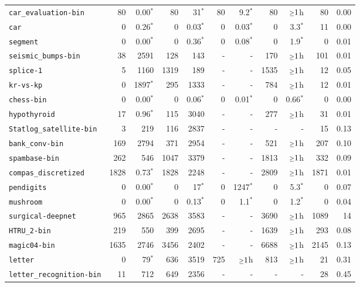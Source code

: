 \begin{tabular}{lrrrrrrrrrr}
\texttt{car\_evaluation-bin} & 80 & 0.00$^*$ & 80 & 31$^*$ & 80 & 9.2$^*$ & 80 & $\mathsmaller{\geq}1$h & 80 & 0.00\\
\texttt{car} & 0 & 0.26$^*$ & 0 & 0.03$^*$ & 0 & 0.03$^*$ & 0 & 3.3$^*$ & 11 & 0.00\\
\texttt{segment} & 0 & 0.00$^*$ & 0 & 0.36$^*$ & 0 & 0.08$^*$ & 0 & 1.9$^*$ & 0 & 0.01\\
\texttt{seismic\_bumps-bin} & 38 & 2591 & 128 & 143 & - & - & 170 & $\mathsmaller{\geq}1$h & 101 & 0.01\\
\texttt{splice-1} & 5 & 1160 & 1319 & 189 & - & - & 1535 & $\mathsmaller{\geq}1$h & 12 & 0.05\\
\texttt{kr-vs-kp} & 0 & 1897$^*$ & 295 & 1333 & - & - & 784 & $\mathsmaller{\geq}1$h & 12 & 0.01\\
\texttt{chess-bin} & 0 & 0.00$^*$ & 0 & 0.06$^*$ & 0 & 0.01$^*$ & 0 & 0.66$^*$ & 0 & 0.00\\
\texttt{hypothyroid} & 17 & 0.96$^*$ & 115 & 3040 & - & - & 277 & $\mathsmaller{\geq}1$h & 31 & 0.01\\
\texttt{Statlog\_satellite-bin} & 3 & 219 & 116 & 2837 & - & - & - & - & 15 & 0.13\\
\texttt{bank\_conv-bin} & 169 & 2794 & 371 & 2954 & - & - & 521 & $\mathsmaller{\geq}1$h & 207 & 0.10\\
\texttt{spambase-bin} & 262 & 546 & 1047 & 3379 & - & - & 1813 & $\mathsmaller{\geq}1$h & 332 & 0.09\\
\texttt{compas\_discretized} & 1828 & 0.73$^*$ & 1828 & 2248 & - & - & 2809 & $\mathsmaller{\geq}1$h & 1871 & 0.01\\
\texttt{pendigits} & 0 & 0.00$^*$ & 0 & 17$^*$ & 0 & 1247$^*$ & 0 & 5.3$^*$ & 0 & 0.07\\
\texttt{mushroom} & 0 & 0.00$^*$ & 0 & 0.13$^*$ & 0 & 1.1$^*$ & 0 & 1.2$^*$ & 0 & 0.04\\
\texttt{surgical-deepnet} & 965 & 2865 & 2638 & 3583 & - & - & 3690 & $\mathsmaller{\geq}1$h & 1089 & 14\\
\texttt{HTRU\_2-bin} & 219 & 550 & 399 & 2695 & - & - & 1639 & $\mathsmaller{\geq}1$h & 293 & 0.08\\
\texttt{magic04-bin} & 1635 & 2746 & 3456 & 2402 & - & - & 6688 & $\mathsmaller{\geq}1$h & 2145 & 0.13\\
\texttt{letter} & 0 & 79$^*$ & 636 & 3519 & 725 & $\mathsmaller{\geq}1$h & 813 & $\mathsmaller{\geq}1$h & 21 & 0.31\\
\texttt{letter\_recognition-bin} & 11 & 712 & 649 & 2356 & - & - & - & - & 28 & 0.45\\

\end{tabular}
